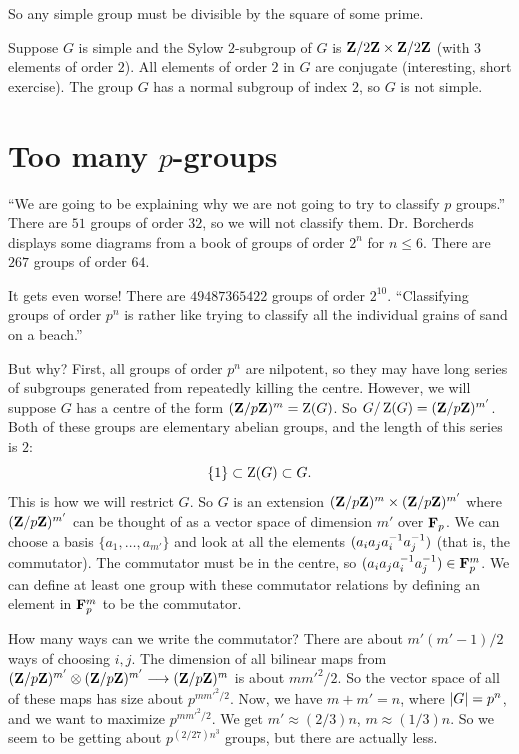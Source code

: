 \documentclass[11pt, twoside]{amsart}
\begin{document}
So any simple group must be divisible by the square of some prime. 

Suppose $G$ is simple and the Sylow $2$-subgroup of $G$ is $\mathbf{Z}/2\mathbf{Z} \times \mathbf{Z}/2\mathbf{Z} $ (with $3$ elements of order $2$). All elements of order $2$ in $G$ are conjugate (interesting, short exercise). The group $G$ has a normal subgroup of index $2$, so $G$ is not simple.

\section{Too many $p$-groups}
``We are going to be explaining why we are not going to try to classify $p$ groups.'' There are $51$ groups of order $32$, so we will not classify them. Dr. Borcherds displays some diagrams from a book of groups of order $2^n$ for $n \le 6$. There are $267$ groups of order $64$. 

It gets even worse! There are $49487365422$ groups of order $2^{10}$. ``Classifying groups of order $p^n$ is rather like trying to classify all the individual grains of sand on a beach.'' 

But why? First, all groups of order $p^n$ are nilpotent, so they may have long series of subgroups generated from repeatedly killing the centre. However, we will suppose $G$ has a centre of the form $(\mathbf{Z}/p\mathbf{Z})^m = \operatorname{Z}(G)$. So $G/\operatorname{Z}(G) = (\mathbf{Z}/p\mathbf{Z})^{m'}$. Both of these groups are elementary abelian groups, and the length of this series is $2$:
$$
\{1\} \subset \operatorname{Z}(G) \subset G.
$$
This is how we will restrict $G$. So $G$ is an extension $(\mathbf{Z}/p\mathbf{Z})^m \times (\mathbf{Z}/p\mathbf{Z})^{m'}$ where $(\mathbf{Z}/p\mathbf{Z})^{m'}$ can be thought of as a vector space of dimension $m'$ over $\mathbf F_p$. We can choose a basis $\{a_1,\hdots , a_{m'}\}$ and look at all the elements $(a_ia_ja_i^{-1} a_j^{-1})$ (that is, the commutator). The commutator must be in the centre,  so  $(a_ia_ja_i^{-1} a_j^{-1}) \in \mathbf F_p^m$. We can define at least one group with these commutator relations by defining an element in $\mathbf F_p^m$ to be the commutator. 

How many ways can we write the commutator? There are about $m'(m'-1)/2$ ways of choosing $i,j$. The dimension of all bilinear maps from $(\mathbf{Z}/p\mathbf{Z})^{m'} \otimes (\mathbf{Z}/p\mathbf{Z})^{m'} \longrightarrow (\mathbf{Z}/p\mathbf{Z})^m$ is about $mm'^2 / 2$. So the vector space of all of these maps has size about $p^{mm'^2/2}$. Now, we have $m+m'=n$, where $\left \lvert G \right \rvert = p^n$, and we want to maximize $p^{mm'^2/2}$. We get $m' \approx (2/3)n$, $m \approx (1/3)n$. So we seem to be getting about $p^{(2/27) n^3}$ groups, but there are actually less.
\end{document}
